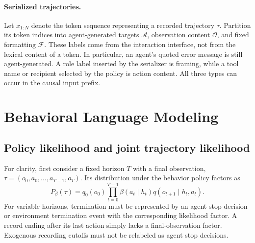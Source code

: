 \documentclass{article} %
\begin{document}
\paragraph{Serialized trajectories.}
Let $x_{1:N}$ denote the token sequence representing a recorded trajectory $\tau$. Partition its token indices into agent-generated targets $\mathcal A$, observation content $\mathcal O$, and fixed formatting $\mathcal F$. These labels come from the interaction interface, not from the lexical content of a token. In particular, an agent's quoted error message is still agent-generated. A role label inserted by the serializer is framing, while a tool name or recipient selected by the policy is action content. All three types can occur in the causal input prefix.

\section{Behavioral Language Modeling}
\label{sec:method}
\subsection{Policy likelihood and joint trajectory likelihood}
For clarity, first consider a fixed horizon $T$ with a final observation, $\tau=(o_0,a_0,\ldots,a_{T-1},o_T)$. Its distribution under the behavior policy factors as
\begin{equation}
 P_\beta(\tau)=q_0(o_0)\prod_{t=0}^{T-1}
 \beta(a_t\mid h_t)q(o_{t+1}\mid h_t,a_t).
 \label{eq:trajectory}
\end{equation}
For variable horizons, termination must be represented by an agent stop decision or environment termination event with the corresponding likelihood factor. A record ending after its last action simply lacks a final-observation factor. Exogenous recording cutoffs must not be relabeled as agent stop decisions.
\end{document}
